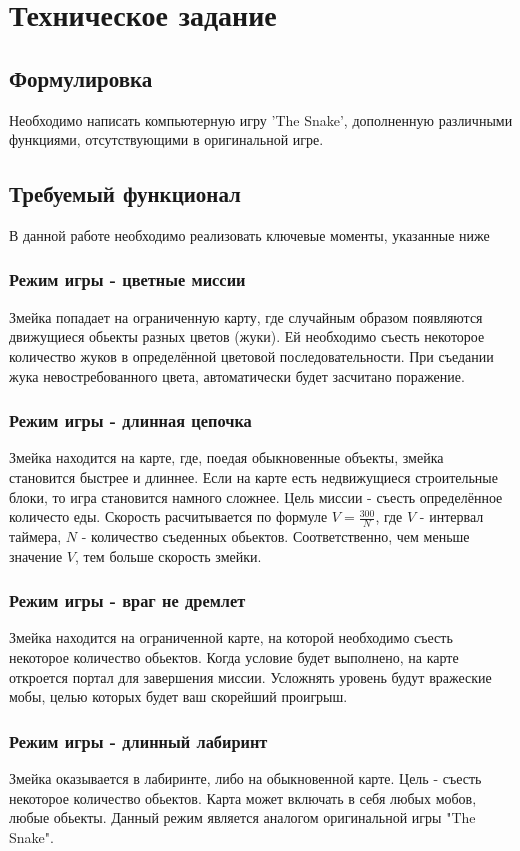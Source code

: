 \documentclass[a4paper,14pt]{extarticle}
\begin{document}

\newpage

\tableofcontents
\newpage

\section{Техническое задание}
\subsection{Формулировка}
Необходимо написать компьютерную игру 'The Snake', дополненную различными функциями, отсутствующими в оригинальной игре.
\subsection{Требуемый функционал}
В данной работе необходимо реализовать ключевые моменты, указанные ниже
\subsubsection{Режим игры - цветные миссии}
Змейка попадает на ограниченную карту, где случайным образом появляются движущиеся обьекты разных цветов (жуки). Ей необходимо съесть некоторое количество жуков в определённой цветовой последовательности. При съедании жука невостребованного цвета, автоматически будет засчитано поражение.
\subsubsection{Режим игры - длинная цепочка}
Змейка находится на карте, где, поедая обыкновенные объекты, змейка становится быстрее и длиннее. Если на карте есть недвижущиеся строительные блоки, то игра становится намного сложнее. Цель миссии - съесть определённое количесто еды. Скорость расчитывается по формуле $V = \frac{300}{N}$, где $V$ - интервал таймера, $N$ - количество съеденных обьектов. Соответственно, чем меньше значение $V$, тем больше скорость змейки.
\subsubsection{Режим игры - враг не дремлет}
Змейка находится на ограниченной карте, на которой необходимо съесть некоторое количество обьектов. Когда условие будет выполнено, на карте откроется портал для завершения миссии. Усложнять уровень будут вражеские мобы, целью которых будет ваш скорейший проигрыш.
\subsubsection{Режим игры - длинный лабиринт}
Змейка оказывается в лабиринте, либо на обыкновенной карте. Цель - съесть некоторое количество обьектов. Карта может включать в себя любых мобов, любые обьекты. Данный режим является аналогом оригинальной игры "The Snake".
\end{document}
